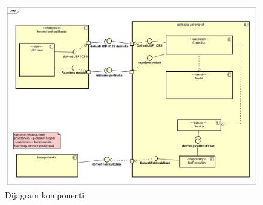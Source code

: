 		\begin{figure}[H]
			\includegraphics[width=\linewidth]{slike/dijagram_komponenti.PNG}
			\centering
			\caption{Dijagram komponenti}
			\label{fig:dijagramkomp}
		\end{figure}
		
		
